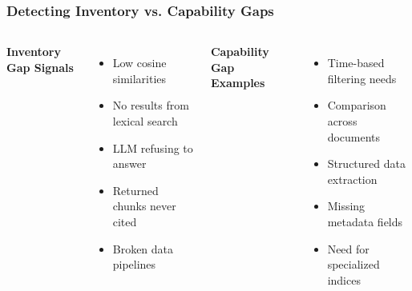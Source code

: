 \begin{frame}
    \frametitle{Detecting Inventory vs. Capability Gaps}
    
    \begin{columns}
        \textbf{Inventory Gap Signals}
        \begin{itemize}
            \item Low cosine similarities
            \item No results from lexical search
            \item LLM refusing to answer
            \item Returned chunks never cited
            \item Broken data pipelines
        \end{itemize}
        
        \textbf{Capability Gap Examples}
        \begin{itemize}
            \item Time-based filtering needs
            \item Comparison across documents
            \item Structured data extraction
            \item Missing metadata fields
            \item Need for specialized indices
        \end{itemize}
    \end{columns}
    
    \begin{center}
    \end{center}
\end{frame}

